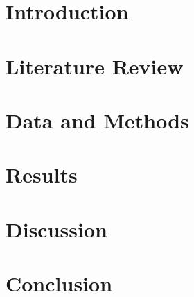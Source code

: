 \documentclass[a4]{article}
\begin{document}

\section{Introduction}

\section{Literature Review}

\section{Data and Methods}

\section{Results}






\section{Discussion}

\section{Conclusion}
\end{document}
